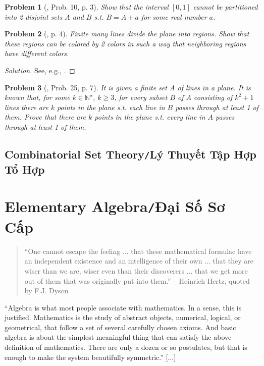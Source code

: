 \documentclass[oneside]{book}
\numberwithin{equation}{section}
\newtheorem{problem}{Problem}[section]
\begin{document}
\begin{problem}[\cite{Gelca_Andreescu2017}, Prob. 10, p. 3]
	Show that the interval $[0,1]$ cannot be partitioned into 2 disjoint sets $A$ and $B$ s.t. $B = A + a$ for some real number $a$.
\end{problem}

\begin{problem}[\cite{Gelca_Andreescu2017}, p. 4]
	Finite many lines divide the plane into regions. Show that these regions can be colored by 2 colors in such a way that neighboring regions have different colors.
\end{problem}

\begin{proof}[Solution]
	See, e.g., \cite[p. 4]{Gelca_Andreescu2017}.
\end{proof}

\begin{problem}[\cite{Gelca_Andreescu2017}, Prob. 25, p. 7]
	It is given a finite set $A$ of lines in a plane. It is known that, for some $k\in\mathbb{N}^\star$, $k\ge 3$, for every subset $B$ of $A$ consisting of $k^2 + 1$ lines there are $k$ points in the plane s.t. each line in $B$ passes through at least 1 of them. Prove that there are $k$ points in the plane s.t. every line in $A$ passes through at least 1 of them.
\end{problem}

\section{Combinatorial Set Theory\texttt{/}Lý Thuyết Tập Hợp Tổ Hợp}


\chapter{Elementary Algebra\texttt{/}Đại Số Sơ Cấp}

\begin{quotation}
	``One cannot escape the feeling $\ldots$ that these mathematical formulae have an independent existence and an intelligence of their own $\ldots$ that they are wiser than we are, wiser even than their discoverers $\ldots$ that we get more out of them that was originally put into them.'' -- Heinrich Hertz, quoted by F.J. Dyson
\end{quotation}
``Algebra is what most people associate with mathematics. In a sense, this is justified. Mathematics is the study of abstract objects, numerical, logical, or geometrical, that follow a set of several carefully chosen axioms. And basic algebra is about the simplest meaningful thing that can satisfy the above definition of mathematics. There are only a dozen or so postulates, but that is enough to make the system beautifully symmetric.'' [$\ldots$]
\end{document}
